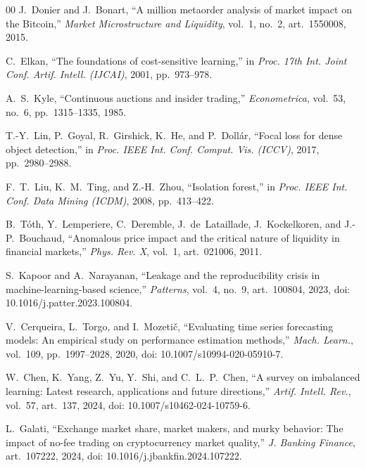 \documentclass{ieeeaccess}
\begin{document}
\begin{thebibliography}{00}
 J.~Donier and J.~Bonart, ``A million metaorder analysis of market impact on the Bitcoin,'' \emph{Market Microstructure and Liquidity}, vol.~1, no.~2, art.~1550008, 2015.

 C.~Elkan, ``The foundations of cost-sensitive learning,'' in \emph{Proc. 17th Int. Joint Conf. Artif. Intell. (IJCAI)}, 2001, pp.~973--978.

 A.~S.~Kyle, ``Continuous auctions and insider trading,'' \emph{Econometrica}, vol.~53, no.~6, pp.~1315--1335, 1985.

 T.-Y.~Lin, P.~Goyal, R.~Girshick, K.~He, and P.~Doll\'{a}r, ``Focal loss for dense object detection,'' in \emph{Proc. IEEE Int. Conf. Comput. Vis. (ICCV)}, 2017, pp.~2980--2988.

 F.~T.~Liu, K.~M.~Ting, and Z.-H.~Zhou, ``Isolation forest,'' in \emph{Proc. IEEE Int. Conf. Data Mining (ICDM)}, 2008, pp.~413--422.

 B.~T\'{o}th, Y.~Lemperiere, C.~Deremble, J.~de~Lataillade, J.~Kockelkoren, and J.-P.~Bouchaud, ``Anomalous price impact and the critical nature of liquidity in financial markets,'' \emph{Phys. Rev. X}, vol.~1, art.~021006, 2011.


 \textcolor{revisionblue}{S.~Kapoor and A.~Narayanan, ``Leakage and the reproducibility crisis in machine-learning-based science,'' \emph{Patterns}, vol.~4, no.~9, art.~100804, 2023, doi: 10.1016/j.patter.2023.100804.}

 \textcolor{revisionblue}{V.~Cerqueira, L.~Torgo, and I.~Mozeti\v{c}, ``Evaluating time series forecasting models: An empirical study on performance estimation methods,'' \emph{Mach. Learn.}, vol.~109, pp.~1997--2028, 2020, doi: 10.1007/s10994-020-05910-7.}

 \textcolor{revisionblue}{W.~Chen, K.~Yang, Z.~Yu, Y.~Shi, and C.~L.~P.~Chen, ``A survey on imbalanced learning: Latest research, applications and future directions,'' \emph{Artif. Intell. Rev.}, vol.~57, art.~137, 2024, doi: 10.1007/s10462-024-10759-6.}

 \textcolor{revisionblue}{L.~Galati, ``Exchange market share, market makers, and murky behavior: The impact of no-fee trading on cryptocurrency market quality,'' \emph{J. Banking Finance}, art.~107222, 2024, doi: 10.1016/j.jbankfin.2024.107222.}

\end{thebibliography}
\end{document}
